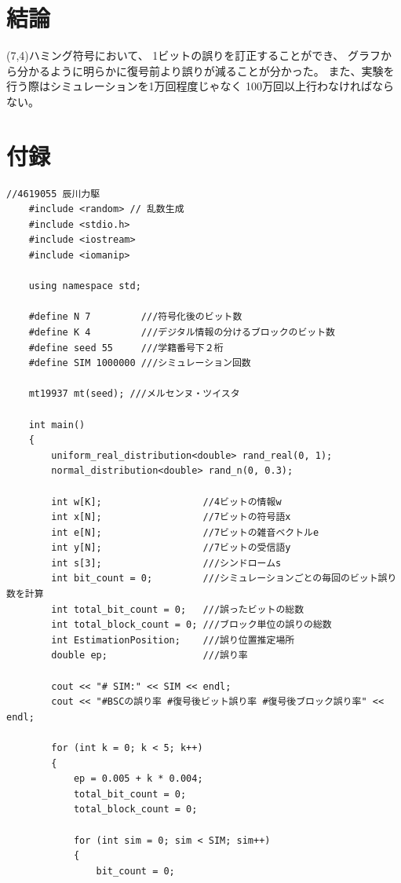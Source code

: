 \documentclass[12pt]{jarticle}
\begin{document}
\section{結論}
 (7,4)ハミング符号において、
1ビットの誤りを訂正することができ、
グラフから分かるように明らかに復号前より誤りが減ることが分かった。
また、実験を行う際はシミュレーションを1万回程度じゃなく
100万回以上行わなければならない。

\clearpage
\appendix
\section{付録}
\begin{lstlisting}[style = lstcpp,caption=kadai3\_3.cpp]
    //4619055 辰川力駆
    #include <random> // 乱数生成
    #include <stdio.h>
    #include <iostream>
    #include <iomanip>
    
    using namespace std;
    
    #define N 7         ///符号化後のビット数
    #define K 4         ///デジタル情報の分けるブロックのビット数
    #define seed 55     ///学籍番号下２桁
    #define SIM 1000000 ///シミュレーション回数
    
    mt19937 mt(seed); ///メルセンヌ・ツイスタ
    
    int main()
    {
        uniform_real_distribution<double> rand_real(0, 1);
        normal_distribution<double> rand_n(0, 0.3);
    
        int w[K];                  //4ビットの情報w
        int x[N];                  //7ビットの符号語x
        int e[N];                  //7ビットの雑音ベクトルe
        int y[N];                  //7ビットの受信語y
        int s[3];                  ///シンドロームs
        int bit_count = 0;         ///シミュレーションごとの毎回のビット誤り数を計算
        int total_bit_count = 0;   ///誤ったビットの総数
        int total_block_count = 0; ///ブロック単位の誤りの総数
        int EstimationPosition;    ///誤り位置推定場所
        double ep;                 ///誤り率
    
        cout << "# SIM:" << SIM << endl;
        cout << "#BSCの誤り率 #復号後ビット誤り率 #復号後ブロック誤り率" << endl;
    
        for (int k = 0; k < 5; k++)
        {
            ep = 0.005 + k * 0.004;
            total_bit_count = 0;
            total_block_count = 0;
    
            for (int sim = 0; sim < SIM; sim++)
            {
                bit_count = 0;
    

\end{lstlisting}
\end{document}
